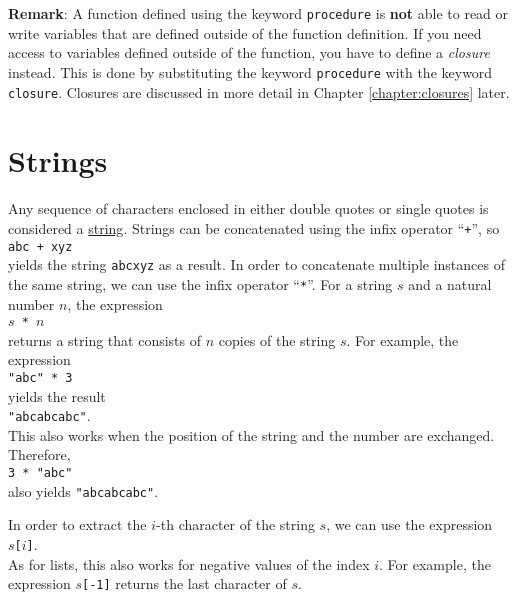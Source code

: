 \noindent
\textbf{Remark}:
A function defined using the keyword \texttt{procedure} is \textbf{not} able to read or write
variables that are defined outside of the function definition.  If you need access to variables
defined outside of the function, you have to define a \emph{closure} instead.  This is done by
substituting the keyword \texttt{procedure} with the keyword \texttt{closure}.  Closures are
discussed in more detail in Chapter \ref{chapter:closures} later.


\section{Strings}
Any sequence of characters enclosed in either double quotes or single quotes is considered a 
\href{https://en.wikipedia.org/wiki/String_(computer_science)}{string}.
Strings can be concatenated using the infix operator ``\texttt{+}'', so
\\[0.2cm]
\hspace*{1.3cm}
\texttt{abc + xyz}
\\[0.2cm]
yields the string \texttt{abcxyz} as a result.
In order to concatenate multiple instances of the same string, we can use the infix
operator ``\texttt{*}''.  For a string $s$ and a natural number $n$, the expression
\\[0.2cm]
\hspace*{1.3cm}
\texttt{$s$ * $n$}
\\[0.2cm]
returns a string that consists of $n$ copies of the string $s$.  For example, the
expression 
\\[0.2cm]
\hspace*{1.3cm}
\texttt{"abc" * 3}
\\[0.2cm]
yields the result
\\[0.2cm]
\hspace*{1.3cm}
\texttt{"abcabcabc"}.
\\[0.2cm]
This also works when the position of the string and the number are exchanged.  Therefore,
\\[0.2cm]
\hspace*{1.3cm}
\texttt{3 * "abc"}
\\[0.2cm]
also yields \texttt{"abcabcabc"}.


In order to extract the $i$-th character of the string $s$, we can use the expression
\\[0.2cm]
\hspace*{1.3cm}
\texttt{$s$[$i$]}.
\\[0.2cm]
As for lists, this also works for negative values of the index $i$.  For example, the expression \texttt{$s$[-1]}
returns the last character of $s$.

